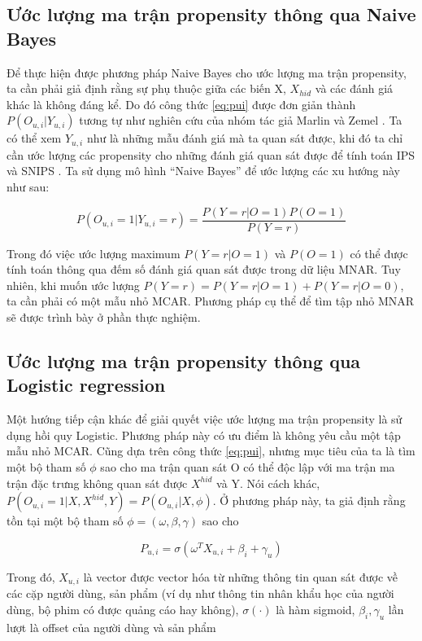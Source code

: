 \subsection{Ước lượng ma trận propensity thông qua Naive Bayes}

Để thực hiện được phương pháp Naive Bayes cho ước lượng ma trận propensity, ta cần phải giả định rằng sự phụ thuộc giữa các biến X,   $X_{hid}$ và các đánh giá khác là không đáng kể. Do đó công thức \ref{eq:pui} được đơn giản thành $P(O_{u,i}|Y_{u,i})$ tương tự như nghiên cứu của nhóm tác giả Marlin và Zemel \cite{marlin_2009}. Ta có thể xem $Y_{u,i}$ như là những mẫu đánh giá mà ta quan sát được, khi đó ta chỉ cần ước lượng các propensity cho những đánh giá quan sát được để tính toán IPS và SNIPS \cite{SNIPS}. Ta sử dụng mô hình ``Naive Bayes'' để ước lượng các xu hướng này như sau:

\begin{equation}
\label{eq:pnb}
    P(O_{u,i} = 1| Y_{u,i} = r) = \frac{P(Y=r|O=1)P(O=1)}{P(Y=r)}
\end{equation}

Trong đó việc ước lượng maximum $P(Y=r|O=1)$ và $P(O=1)$ có thể được tính toán thông qua đếm số đánh giá  quan sát được trong dữ liệu MNAR. Tuy nhiên, khi muốn ước lượng $P(Y=r) = P(Y=r|O=1) + P(Y=r|O=0)$, ta cần phải có một mẫu nhỏ MCAR. Phương pháp cụ thể để tìm tập nhỏ MNAR sẽ được trình bày ở phần thực nghiệm.  

\subsection{Ước lượng ma trận propensity thông qua Logistic regression}
Một hướng tiếp cận khác để giải quyết việc  ước lượng ma trận propensity là sử dụng hồi quy Logistic. Phương pháp này có ưu điểm là không yêu cầu một tập mẫu nhỏ MCAR. Cũng dựa trên công thức \ref{eq:pui}, nhưng mục tiêu của ta là tìm một bộ tham số $\phi$ sao cho ma trận quan sát O có thể độc lập với ma trận ma
trận đặc trưng không quan sát được $X^{hid}$ và Y. Nói cách khác, $P(O_{u,i} = 1|X, X^{hid},Y) = P(O_{u,i}|X,\phi)$. Ở phương pháp này, ta giả định rằng tồn tại một bộ tham số $\phi=(\omega, \beta, \gamma)$ sao cho

\begin{equation}
    \label{eq:plr}
    P_{u,i} = \sigma(\omega^TX_{u,i} + \beta_i + \gamma_u)
\end{equation}


Trong đó, $X_{u,i}$ là vector được vector hóa từ những thông tin quan sát được về các cặp người dùng, sản phẩm (ví dụ như thông tin nhân khẩu học của người dùng, bộ phim có được quảng cáo hay không), $\sigma(\cdot)$ là hàm sigmoid, $\beta_i, \gamma_u$ lần lượt là offset của người dùng và sản phẩm


